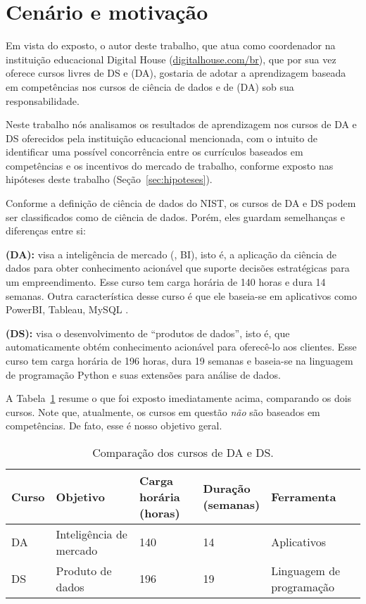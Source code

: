\section{Cenário e motivação}\label{sec:motivacao}

Em vista do exposto, o autor deste trabalho, que atua como coordenador na instituição educacional Digital House (\url{digitalhouse.com/br}), que por sua vez oferece cursos livres de DS e  (DA), gostaria de adotar a aprendizagem baseada em competências nos cursos de ciência de dados e de  (DA) sob sua responsabilidade.

Neste trabalho nós analisamos os resultados de aprendizagem nos cursos de DA e DS oferecidos pela instituição educacional mencionada, com o intuito de identificar uma possível concorrência entre os currículos baseados em competências e os incentivos do mercado de trabalho, conforme exposto nas hipóteses deste trabalho (Seção~\ref{sec:hipoteses}).

Conforme a definição de ciência de dados do NIST, os cursos de DA e DS podem ser classificados como de ciência de dados.
Porém, eles guardam semelhanças e diferenças entre si:
\begin{compactitem}
	\item \textbf{ (DA):} visa a inteligência de mercado (, BI), isto é, a aplicação da ciência de dados para obter conhecimento acionável que suporte decisões estratégicas para um empreendimento.
	Esse curso tem carga horária de 140 horas e dura 14 semanas.
	Outra característica desse curso é que ele baseia-se em aplicativos como PowerBI, Tableau, MySQL \etc.

	\item \textbf{ (DS):} visa o desenvolvimento de ``produtos de dados'', isto é,  que automaticamente obtém conhecimento acionável para oferecê-lo aos clientes.
	Esse curso tem carga horária de 196 horas, dura 19 semanas e baseia-se na linguagem de programação Python e suas extensões para análise de dados.
\end{compactitem}

A Tabela~\ref{tab:da-vs-ds} resume o que foi exposto imediatamente acima, comparando os dois cursos.
Note que, atualmente, os cursos em questão \emph{não} são baseados em competências.
De fato, esse é nosso objetivo geral.

\begin{table}
	\caption{Comparação dos cursos de DA e DS.}
	\label{tab:da-vs-ds}
	\footnotesize
	\begin{tabular}{lllll}
		\toprule
		Curso & Objetivo & \shortstack[l]{Carga\\horária (horas)} & \shortstack[c]{Duração\\(semanas)} & Ferramenta\\
		\midrule
		DA & Inteligência de mercado & 140 & 14 & Aplicativos\\
		DS & Produto de dados & 196 & 19 & Linguagem de programação	\\
		\bottomrule
	\end{tabular}
\end{table}